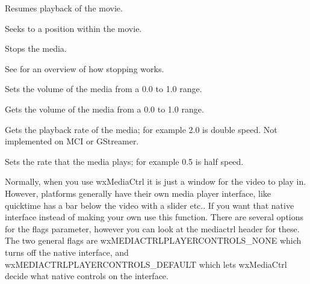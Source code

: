 \label{wxmediactrlplay}


Resumes playback of the movie.


\label{wxmediactrlsetposition}


Seeks to a position within the movie.


\label{wxmediactrlstop}


Stops the media.

See  for an overview of how stopping works.


\label{wxmediactrlsetvolume}


Sets the volume of the media from a 0.0 to 1.0 range.


\label{wxmediactrlgetvolume}


Gets the volume of the media from a 0.0 to 1.0 range.


\label{wxmediactrlgetplaybackrate}


Gets the playback rate of the media; for example 2.0 is double speed.
Not implemented on MCI or GStreamer.


\label{wxmediactrlsetplaybackrate}


Sets the rate that the media plays; for example 0.5 is half speed.


\label{wxmediactrlshowplayercontrols}


Normally, when you use wxMediaCtrl it is just a window for the video to 
play in.  However, platforms generally have their own media player interface,
like quicktime has a bar below the video with a slider etc..  If you want that native 
interface instead of making your own use this function.  There are several options
for the flags parameter, however you can look at the mediactrl header for these. 
The two general flags are wxMEDIACTRLPLAYERCONTROLS\_NONE which turns off the 
native interface, and wxMEDIACTRLPLAYERCONTROLS\_DEFAULT which lets wxMediaCtrl
decide what native controls on the interface.

